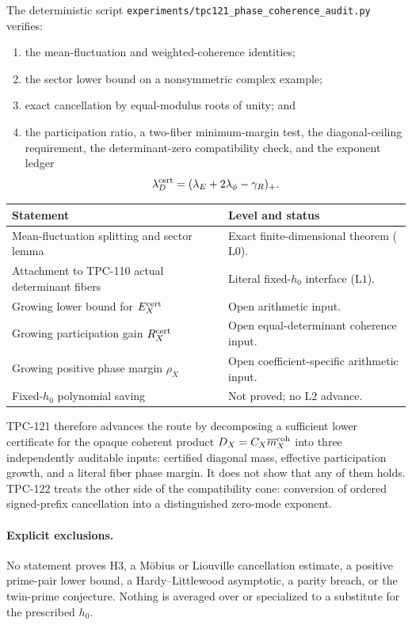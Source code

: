 \documentclass[11pt]{article}
\theoremstyle{definition}
\theoremstyle{remark}
\newcommand{\Lzero}{\mathrm{L0}}
\newcommand{\Lone}{\mathrm{L1}}
\newcommand{\Ltwo}{\mathrm{L2}}
\begin{document}
The deterministic script
\texttt{experiments/tpc121\_phase\_coherence\_audit.py} verifies:
\begin{enumerate}[leftmargin=2em]
\item the mean-fluctuation and weighted-coherence identities;
\item the sector lower bound on a nonsymmetric complex example;
\item exact cancellation by equal-modulus roots of unity; and
\item the participation ratio, a two-fiber minimum-margin test, the
diagonal-ceiling requirement, the determinant-zero compatibility
check, and the exponent ledger
\[
\lambda_D^{\rm cert}
=(\lambda_E+2\lambda_\phi-\gamma_R)_+.
\]
\end{enumerate}

\begin{center}
\small
\begin{tabularx}{\textwidth}{@{}p{}X@{}}
\toprule
Statement & Level and status\\
\midrule
Mean-fluctuation splitting and sector lemma
& Exact finite-dimensional theorem (\(\Lzero\)).\\
Attachment to TPC-110 actual determinant fibers
& Literal fixed-\(h_0\) interface (\(\Lone\)).\\
Growing lower bound for \(E_X^{\rm cert}\)
& Open arithmetic input.\\
Growing participation gain \(R_X^{\rm cert}\)
& Open equal-determinant coherence input.\\
Growing positive phase margin \(\rho_X\)
& Open coefficient-specific arithmetic input.\\
Fixed-\(h_0\) polynomial saving
& Not proved; no \(\Ltwo\) advance.\\
\bottomrule
\end{tabularx}
\end{center}

TPC-121 therefore advances the route by decomposing a sufficient lower
certificate for the opaque coherent product
\(D_X=C_X\overline m_X^{\rm coh}\) into three independently auditable
inputs: certified diagonal mass, effective participation growth, and
a literal fiber phase margin.  It does not show that any of them holds.
TPC-122 treats the other side of the compatibility cone: conversion
of ordered signed-prefix cancellation into a distinguished zero-mode
exponent.

\paragraph{Explicit exclusions.}
No statement proves H3, a Möbius or Liouville cancellation estimate,
a positive prime-pair lower bound, a Hardy--Littlewood asymptotic, a
parity breach, or the twin-prime conjecture.  Nothing is averaged over
or specialized to a substitute for the prescribed \(h_0\).

\begingroup
\small
\setlength{\bibsep}{2pt plus 0.3ex}
\sloppy


\endgroup
\end{document}
